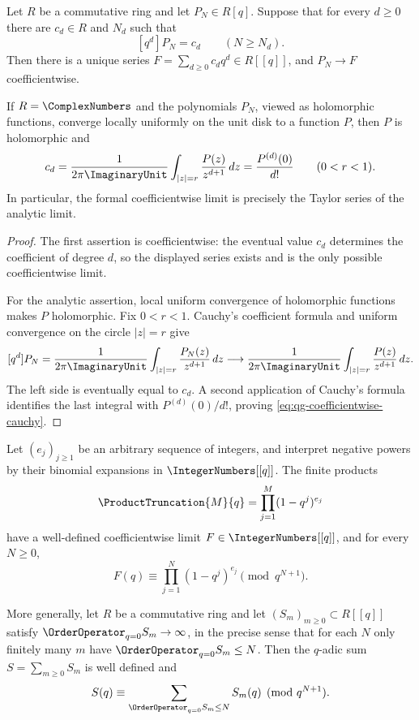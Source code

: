 \begin{proposition}
\label{qg:prop-coefficientwise-limit}
Let \(R\) be a commutative ring and let \(P_N\in R[q]\).  Suppose that for
every \(d\ge0\) there are \(c_d\in R\) and \(N_d\) such that
\[
 [q^d]P_N=c_d\qquad(N\ge N_d).
\]
Then there is a unique series \(F=\sum_{d\ge0}c_dq^d\in R[[q]]\), and
\(P_N\to F\) coefficientwise.

If \(R=\ComplexNumbers\) and the polynomials \(P_N\), viewed as holomorphic
functions, converge locally uniformly on the unit disk to a function \(P\),
then \(P\) is holomorphic and
\begin{equation}
 c_d=\frac{1}{2\pi\ImaginaryUnit}
     \int_{|z|=r}\frac{P(z)}{z^{d+1}}\,dz
     =\frac{P^{(d)}(0)}{d!}
 \qquad(0<r<1).
\label{eq:qg-coefficientwise-cauchy}
\end{equation}
In particular, the formal coefficientwise limit is precisely the Taylor
series of the analytic limit.
\end{proposition}

\begin{proof}
The first assertion is coefficientwise: the eventual value \(c_d\) determines
the coefficient of degree \(d\), so the displayed series exists and is the
only possible coefficientwise limit.

For the analytic assertion, local uniform convergence of holomorphic
functions makes \(P\) holomorphic.  Fix \(0<r<1\).  Cauchy's coefficient
formula and uniform convergence on the circle \(|z|=r\) give
\[
 [q^d]P_N
 =\frac{1}{2\pi\ImaginaryUnit}
   \int_{|z|=r}\frac{P_N(z)}{z^{d+1}}\,dz
 \longrightarrow
 \frac{1}{2\pi\ImaginaryUnit}
   \int_{|z|=r}\frac{P(z)}{z^{d+1}}\,dz.
\]
The left side is eventually equal to \(c_d\).  A second application of
Cauchy's formula identifies the last integral with \(P^{(d)}(0)/d!\), proving
\eqref{eq:qg-coefficientwise-cauchy}.
\end{proof}

\begin{proposition}
\label{qg:prop-truncation-principle}
Let \((e_j)_{j\ge1}\) be an arbitrary sequence of integers, and interpret
negative powers by their binomial expansions in \(\IntegerNumbers[[q]]\).
The finite products
\[
 \ProductTruncation{M}{q}=\prod_{j=1}^{M}(1-q^j)^{e_j}
\]
have a well-defined coefficientwise limit \(F\in\IntegerNumbers[[q]]\), and
for every \(N\ge0\),
\begin{equation}
 F(q)\equiv\prod_{j=1}^{N}(1-q^j)^{e_j}
 \pmod{q^{N+1}}.
\label{eq:qg-truncation-product}
\end{equation}

More generally, let \(R\) be a commutative ring and let
\((S_m)_{m\ge0}\subset R[[q]]\) satisfy
\(\OrderOperator_{q=0} S_m\to\infty\), in the precise sense that for each
\(N\) only finitely many \(m\) have
\(\OrderOperator_{q=0} S_m\le N\).  Then the \(q\)-adic sum
\(S=\sum_{m\ge0}S_m\) is well defined and
\begin{equation}
 S(q)\equiv
 \sum_{\OrderOperator_{q=0} S_m\le N}S_m(q)
 \pmod{q^{N+1}}.
\label{eq:qg-truncation-series}
\end{equation}
\end{proposition}

